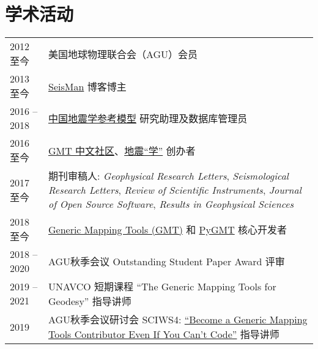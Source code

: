 \section*{学术活动}

\newcommand{\tabitem}{~~\llap{\textbullet}~~}

\begin{tabular}{p{} p{}}
2012 至今 & 美国地球物理联合会（AGU）会员 \\
2013 至今 & \href{https://blog.seisman.info}{SeisMan} 博客博主 \\
2016 -- 2018    & \href{http://chinageorefmodel.org/}{中国地震学参考模型} 研究助理及数据库管理员 \\
2016 至今 & \href{http://gmt-china.org/}{GMT 中文社区}、\href{https://seismo-learn.org/}{地震``学''} 创办者 \\
2017 至今 & 期刊审稿人:
            \textit{Geophysical Research Letters},
            \textit{Seismological Research Letters},
            \textit{Review of Scientific Instruments},
            \textit{Journal of Open Source Software},
            \textit{Results in Geophysical Sciences} \\
2018 至今 & \href{https://github.com/GenericMappingTools/gmt}{Generic Mapping Tools (GMT)} 和 \href{https://github.com/GenericMappingTools/pygmt}{PyGMT} 核心开发者 \\
2018 -- 2020 & AGU秋季会议 Outstanding Student Paper Award 评审 \\
2019 -- 2021 & UNAVCO 短期课程 ``The Generic Mapping Tools for Geodesy'' 指导讲师 \\
2019 & AGU秋季会议研讨会 SCIWS4: \href{https://www.agu.org/Events/SCIWS4-Generic-Mapping-Tools}{``Become a Generic Mapping Tools Contributor Even If You Can't Code''} 指导讲师 \\
\end{tabular}
